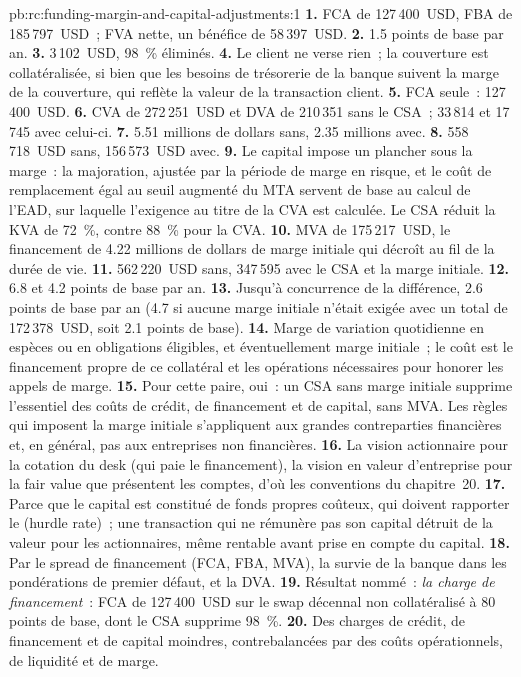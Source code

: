 \begin{solution}{pb:rc:funding-margin-and-capital-adjustments:1}
\textbf{1.} FCA de 127\,400~USD, FBA de 185\,797~USD~; FVA nette, un bénéfice de 58\,397~USD.
\textbf{2.} 1.5 points de base par an.
\textbf{3.} 3\,102~USD, 98~\% éliminés.
\textbf{4.} Le client ne verse rien~; la couverture est collatéralisée, si bien que les besoins de trésorerie de la banque suivent
la marge de la couverture, qui reflète la valeur de la transaction client.
\textbf{5.} FCA seule~: 127\,400~USD.
\textbf{6.} CVA de 272\,251~USD et DVA de 210\,351 sans le CSA~; 33\,814 et 17\,745 avec celui-ci.
\textbf{7.} 5.51 millions de dollars sans, 2.35 millions avec.
\textbf{8.} 558\,718~USD sans, 156\,573~USD avec.
\textbf{9.} Le capital impose un plancher sous la marge~: la majoration, ajustée par la période de marge en risque, et le coût de remplacement égal au seuil augmenté du MTA
servent de base au calcul de l'EAD, sur laquelle l'exigence au titre de la CVA est calculée. Le CSA réduit
la KVA de 72~\%, contre 88~\% pour la CVA.
\textbf{10.} MVA de 175\,217~USD, le financement de 4.22 millions de dollars de marge initiale qui décroît
au fil de la durée de vie.
\textbf{11.} 562\,220~USD sans, 347\,595 avec le CSA et la marge initiale.
\textbf{12.} 6.8 et 4.2 points de base par an.
\textbf{13.} Jusqu'à concurrence de la différence, 2.6 points de base par an (4.7 si aucune marge initiale n'était exigée
avec un total de 172\,378~USD, soit 2.1 points de base).
\textbf{14.} Marge de variation quotidienne en espèces ou en obligations éligibles, et éventuellement marge initiale~; le coût
est le financement propre de ce collatéral et les opérations nécessaires pour honorer les appels de marge.
\textbf{15.} Pour cette paire, oui~: un CSA sans marge initiale supprime l'essentiel des coûts de crédit, de financement et
de capital, sans MVA. Les règles qui imposent la marge initiale s'appliquent aux grandes contreparties financières
et, en général, pas aux entreprises non financières.
\textbf{16.} La vision actionnaire pour la cotation du desk (qui paie le financement), la vision en valeur d'entreprise pour la fair value que présentent les comptes,
d'où les conventions du chapitre~20.
\textbf{17.} Parce que le capital est constitué de fonds propres coûteux, qui doivent rapporter le  (hurdle rate)~;
une transaction qui ne rémunère pas son capital détruit de la valeur pour les actionnaires, même rentable avant prise en compte du capital.
\textbf{18.} Par le spread de financement (FCA, FBA, MVA), la survie de la banque dans les pondérations de premier défaut,
et la DVA.
\textbf{19.} Résultat nommé~: \emph{la charge de financement}~: FCA de 127\,400~USD sur le swap décennal
non collatéralisé à 80 points de base, dont le CSA supprime 98~\%.
\textbf{20.} Des charges de crédit, de financement et de capital moindres, contrebalancées
par des coûts opérationnels, de liquidité et de marge.
\end{solution}

